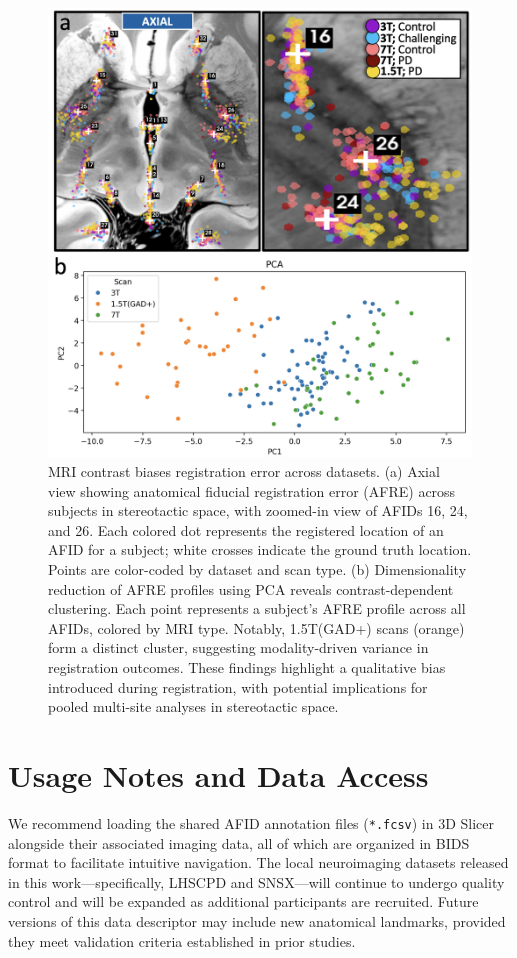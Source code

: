 \begin{figure}
    \centering
    \includegraphics[width=1\linewidth]{figs/ch2_Figure_bias.png}
    \caption{MRI contrast biases registration error across datasets. (a) Axial view showing anatomical fiducial registration error (AFRE) across subjects in stereotactic space, with zoomed-in view of AFIDs 16, 24, and 26. Each colored dot represents the registered location of an AFID for a subject; white crosses indicate the ground truth location. Points are color-coded by dataset and scan type. (b) Dimensionality reduction of AFRE profiles using PCA reveals contrast-dependent clustering. Each point represents a subject's AFRE profile across all AFIDs, colored by MRI type. Notably, 1.5T(GAD+) scans (orange) form a distinct cluster, suggesting modality-driven variance in registration outcomes. These findings highlight a qualitative bias introduced during registration, with potential implications for pooled multi-site analyses in stereotactic space.
    }
    \label{fig:ch2_Figure_bias}
\end{figure}



\section{Usage Notes and Data Access}
We recommend loading the shared AFID annotation files (\texttt{*.fcsv}) in 3D Slicer alongside their associated imaging data, all of which are organized in BIDS format to facilitate intuitive navigation. The local neuroimaging datasets released in this work—specifically, LHSCPD and SNSX—will continue to undergo quality control and will be expanded as additional participants are recruited. Future versions of this data descriptor may include new anatomical landmarks, provided they meet validation criteria established in prior studies.

